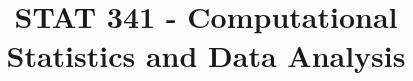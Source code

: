 



\title{STAT 341 - Computational Statistics and Data Analysis}



\maketitle
\tableofcontents
\newpage




